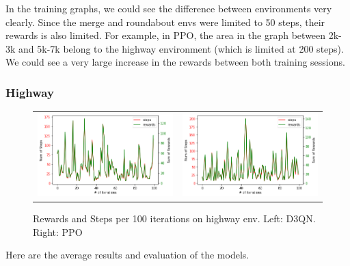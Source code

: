\documentclass[leqno]{article}
\begin{document}
\begin{multicols}{2}
In the training graphs, we could see the difference between environments very clearly. Since the merge and roundabout envs were limited to 50 steps, their rewards is also limited. For example, in PPO, the area in the graph between 2k-3k and 5k-7k belong to the highway environment (which is limited at 200 steps). We could see a very large increase in the rewards between both training sessions.

\subsubsection{Highway}

\begin{figure}[H]
  \begin{tabular}{ll}
    \includegraphics[scale=0.25]{figs/d3qn_ex3_highway.png}&
    \includegraphics[scale=0.25]{figs/ppo_ex3_highway.png}\\
  \end{tabular}
  \caption{Rewards and Steps per 100 iterations on highway env. Left: D3QN. Right: PPO}
  \label{hyperparams}
\end{figure}


Here are the average results and evaluation of the models.\\


\end{multicols}
\end{document}
